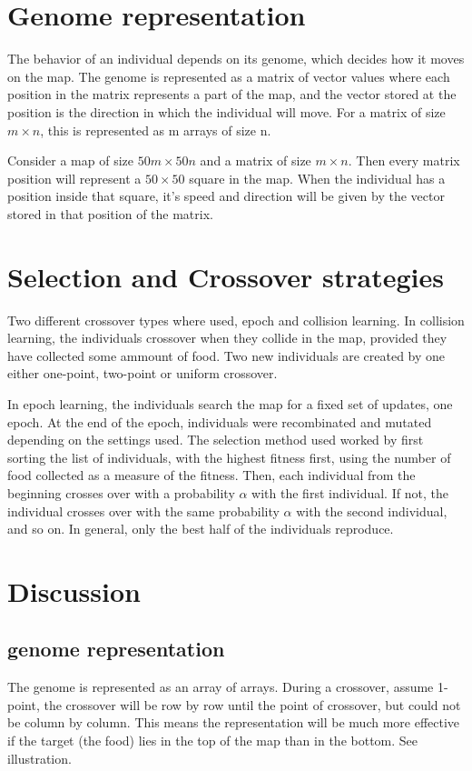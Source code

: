 \documentclass[a4paper,12pt]{article}
\begin{document}
\section{Genome representation}
The behavior of an individual depends on its genome, which decides how it moves on the map. The genome is represented as a matrix of vector values where each position in the matrix represents a part of the map, and the vector stored at the position is the direction in which the individual will move. For a matrix of size $m \times n$, this is represented as m arrays of size n.

Consider a map of size $50m \times 50n$ and a matrix of size $m \times n$. Then every matrix position will represent a $50\times50$ square in the map. When the individual has a position inside that square, it's speed and direction will be given by the vector stored in that position of the matrix.

\section{Selection and Crossover strategies}
Two different crossover types where used, epoch and collision learning. In collision learning, the individuals crossover when they collide in the map, provided they have collected some ammount of food. Two new individuals are created by one either one-point, two-point or uniform crossover.

In epoch learning, the individuals search the map for a fixed set of updates, one epoch. At the end of the epoch, individuals were recombinated and mutated depending on the settings used. The selection method used worked by first sorting the list of individuals, with the highest fitness first, using the number of food collected as a measure of the fitness. Then, each individual from the beginning crosses over with a probability $\alpha$ with the first individual. If not, the individual crosses over with the same probability $\alpha$ with the second individual, and so on. In general, only the best half of the individuals reproduce.


\section{Discussion}
\subsection{genome representation}
The genome is represented as an array of arrays. During a crossover, assume 1-point, the crossover will be row by row until the point of crossover, but could not be column by column. This means the representation will be much more effective if the target (the food) lies in the top of the map than in the bottom. See illustration.
\end{document}
